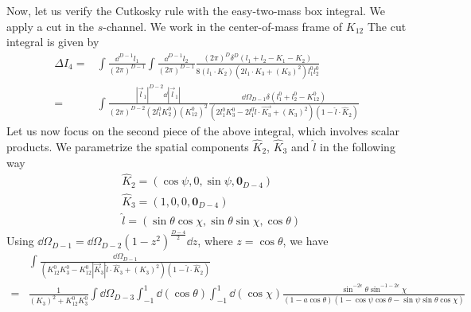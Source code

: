 Now, let us verify the Cutkosky rule with the easy-two-mass box integral.
We apply a cut in the $s$-channel.
We work in the center-of-mass frame of $K_{12}$
The cut integral is given by
\begin{equation}\label{cuti4}
\begin{split}
\Delta I_4 =&
\int\frac{\dd^{D-1}l_1}{(2\pi)^{D-1}} 
 \int\frac{\dd^{D-1}l_2}{(2\pi)^{D-1}}
\frac{(2\pi)^D\delta^{D}(l_1 + l_2 - K_1- K_2)}{8(l_1\cdot K_2)(2l_1\cdot K_3 + (K_3)^2)l_1^0 l_2^0} 
\\
\iffalse
 = & 
\int\frac{\dd^{D-1}l_1}{(2\pi)^{D-2}} 
\frac{\delta(l_1^0 + l_2^0 - K_1^0 - K_2^0)}{8 l_1^0 l_2^0 (2l_1\cdot K_3 + (K_3)^2)(l_1\cdot K_2)}
\\
\fi
 = & \int\frac{|\vec{l}_1|^{D-2} \dd |\vec{l}_1|}{(2\pi)^{D-2}(2l_1^0 K_2^0)(K_{12}^0)^2}
\frac{\dd \Omega_{D-1} \delta(l_1^0 + l_2^0 - K^0_{12})}{(2l_1^0 K_3^0 - 2l_1^0 \hat{l}\cdot\vec{K_3} + (K_3)^2)(1-\hat{l}\cdot \hat{K}_2)}
\end{split}
\end{equation}
Let us now focus on the second piece of the above integral, which involves scalar products. 
We parametrize the spatial components $\hat{K}_2$, $\hat{K}_3$ and $\hat{l}$ in the following way
\begin{equation}\label{spatial_param}
\begin{split}
& \hat{K}_2 = (\cos\psi, 0, \sin \psi, \mathbf{0}_{D-4})
\\
& \hat{K}_3 = (1,0,0,\mathbf{0}_{D-4})
\\
& \hat{l} = (\sin\theta\cos\chi, \sin\theta\sin\chi,\cos\theta)
\end{split}
\end{equation}
Using $\dd\Omega_{D-1} = \dd \Omega_{D-2}(1-z^2)^{\frac{D-4}{2}}\dd z$, where $z = \cos\theta$, 
we have
\begin{equation}\label{omega11}
\begin{split}
& \int\frac{\dd \Omega_{D-1}}{(K_{12}^0 K_3^0 - K_{12}^0 |\vec{K}_3| \hat{l}\cdot \hat{K}_3 + (K_3)^2)(1-\hat{l}\cdot\hat{K}_2)}
\\
= & \frac{1}{(K_3)^2 + K_{12}^0 K_3^0}\int \dd \Omega_{D-3}
\int_{-1}^1 \dd(\cos\theta)\int_{-1}^1\dd(\cos \chi)\frac{\sin^{-2\epsilon}\theta \sin^{-1-2\epsilon}\chi}{(1-a\cos\theta)(1-\cos\psi\cos\theta  - \sin\psi\sin\theta\cos\chi)}
\end{split}
\end{equation}
